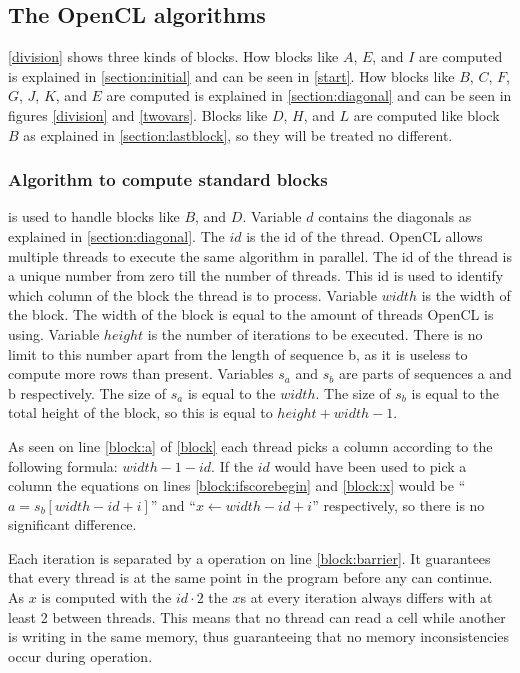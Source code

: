 \subsection{The OpenCL algorithms} \label{algorithms}
\cref{division} shows three kinds of blocks.
How blocks like $A$, $E$, and $I$ are computed is explained in \cref{section:initial} and can be seen in \cref{start}.
How blocks like $B$, $C$, $F$, $G$, $J$, $K$, and $E$ are computed is explained in \cref{section:diagonal} and can be seen in figures \ref{division} and \ref{twovars}.
Blocks like $D$, $H$, and $L$ are computed like block $B$ as explained in \cref{section:lastblock}, so they will be treated no different.

\subsubsection{Algorithm to compute standard blocks}
 is used to handle blocks like $B$, and $D$.
Variable $d$ contains the diagonals as explained in \cref{section:diagonal}.
The $id$ is the id of the thread.
OpenCL allows multiple threads to execute the same algorithm in parallel.
The id of the thread is a unique number from zero till the number of threads.
This id is used to identify which column of the block the thread is to process.
Variable $width$ is the width of the block.
The width of the block is equal to the amount of threads OpenCL is using.
Variable $height$ is the number of iterations to be executed.
There is no limit to this number apart from the length of sequence b, as it is useless to compute more rows than present.
Variables $s_a$ and $s_b$ are parts of sequences a and b respectively.
The size of $s_a$ is equal to the $width$.
The size of $s_b$ is equal to the total height of the block, so this is equal to $height + width - 1$.

As seen on line \ref{block:a} of \cref{block} each thread picks a column according to the following formula: $width - 1 - id$.
If the $id$ would have been used to pick a column the equations on lines \ref{block:ifscorebegin} and \ref{block:x} would be ``$a = s_b[width - id + i]$'' and ``$x \gets width - id + i$'' respectively, so there is no significant difference.

Each iteration is separated by a  operation on line \ref{block:barrier}.
It guarantees that every thread is at the same point in the program before any can continue.
As $x$ is computed with the $id \cdot 2$ the $x$s at every iteration always differs with at least 2 between threads.
This means that no thread can read a cell while another is writing in the same memory, thus guaranteeing that no memory inconsistencies occur during operation.

